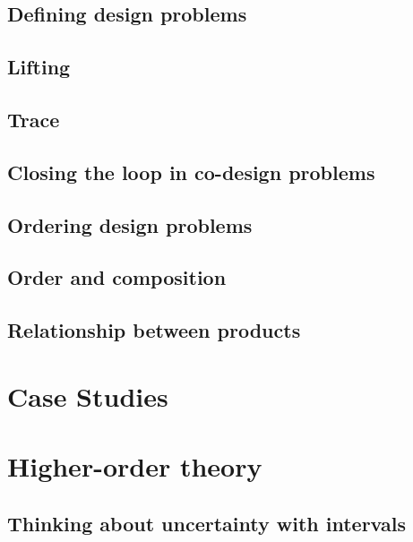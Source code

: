 {\chapter{Defining design problems}

\clearpage
%
\chapter{Lifting}

\clearpage
%
\chapter{Trace}

\clearpage
%
\chapter{Closing the loop in co-design problems}

\clearpage
%
\chapter{Ordering design problems}

\clearpage
%
\chapter{Order and composition}

\clearpage
%
\chapter{Relationship between products}

\clearpage
%
%
 



\part{Case Studies}

\part{Higher-order theory}


\chapter{Thinking about uncertainty with intervals}

\clearpage
%
}
